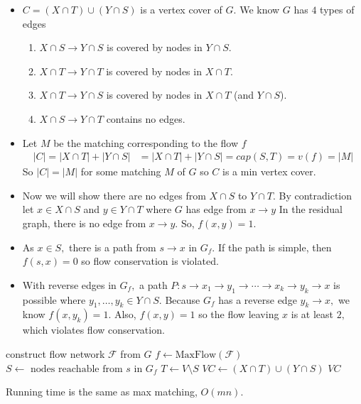 \documentclass[a4paper,12pt]{article}
\begin{document}
\begin{itemize}
\begin{itemize}
        \item $C=(X\cap T)\cup(Y\cap S)$ is a vertex cover of $G.$ We know $G$ has $4$ types of edges \begin{enumerate}
            \item $X\cap S\to Y\cap S$ is covered by nodes in $Y\cap S.$
            \item $X\cap T\to Y\cap T$ is covered by nodes in $X\cap T.$
            \item $X\cap T\to Y\cap S$ is covered by nodes in $X\cap T$ (and $Y\cap S$).
            \item $X\cap S\to Y\cap T$ contains no edges.
        \end{enumerate}
        \item Let $M$ be the matching corresponding to the flow $f$ \begin{align}
            |C|=|X\cap T|+|Y\cap S|&=|X\cap T|+|Y\cap S|=cap(S,T)=v(f)=|M|
        \end{align}
        So $|C|=|M|$ for some matching $M$ of $G$ so $C$ is a min vertex cover.
        \item Now we will show there are no edges from $X\cap S$ to $Y\cap T$. By contradiction let  $x\in X\cap S$ and $y\in Y\cap T$ where $G$ has edge from $x\to y$ In the residual graph, there is no edge from $x\to y.$ So, $f(x,y)=1.$
        \item As $x\in S,$ there is a path from $s\to x$ in $G_f.$ If the path is simple, then $f(s,x)=0$ so flow conservation is violated.
        \item With reverse edges in $G_f,$ a path $P:s\to x_1\to y_1\to\cdots\to x_k\to y_k\to x$ is possible where $y_1,\dots,y_k\in Y\cap S.$ Because $G_f$ has a reverse edge $y_k\to x,$ we know $f(x,y_k)=1.$ Also, $f(x,y)=1$ so the flow leaving $x$ is at least $2,$ which violates flow conservation.
    \end{itemize}
    \begin{algorithmic}[1]
            \State construct flow network $\mathcal F$ from $G$
            \State $f\gets\mathrm{MaxFlow}(\mathcal F)$
            \State $S\gets\text{ nodes reachable from }s\text{ in }G_f$
            \State $T\gets V\setminus S$
            \State $VC\gets(X\cap T)\cup(Y\cap S)$
            \State \Return $VC$
        \EndProcedure
    \end{algorithmic}
    Running time is the same as max matching, $O(mn).$
\end{itemize}
\end{document}
